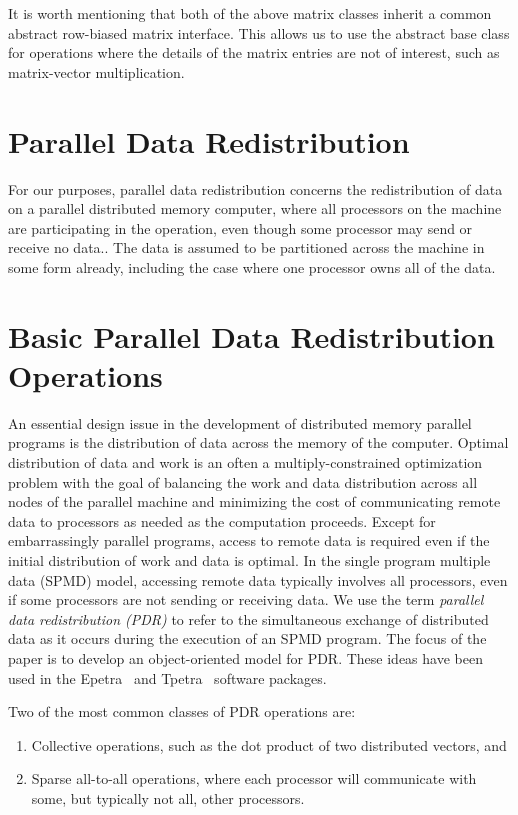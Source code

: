 \documentclass[12pt,relax]{PetraObjectModel}
\begin{document}
It is worth mentioning that both of the above matrix classes inherit 
a common abstract row-biased matrix interface.  This allows us to use the
abstract base class for operations where the details of the matrix entries
are not of interest, such as matrix-vector multiplication.



\section{Parallel Data Redistribution}
For our purposes, parallel data redistribution concerns the redistribution of 
data on a parallel distributed memory computer, where all processors on the 
machine are participating in the operation, even though some processor may send
or receive no data..  The data is assumed to be 
partitioned across the machine in some form already, including the case where one
processor owns all of the data.


\section{Basic Parallel Data Redistribution Operations}

An essential design issue in the development of distributed memory parallel programs is the
distribution of data across the memory of the computer.  Optimal distribution of data and work
is an often a multiply-constrained optimization problem with the goal of balancing the work and
data distribution across all nodes of the parallel machine and minimizing the cost of
communicating remote data to processors as needed as the computation proceeds.
Except for embarrassingly parallel programs, access to remote data is required even if
the initial distribution of work and data is optimal.  In the single program multiple data
(SPMD) model, accessing remote data typically involves all processors, even if some processors
are not sending or receiving data.  We use the term {\it parallel data
redistribution (PDR)} to refer to the simultaneous exchange of distributed data as it occurs during
the execution of an SPMD program.  The focus of the paper is to develop an object-oriented
model for PDR.  These ideas have been used in the Epetra~\cite{Epetra-Ref-Manual} and
Tpetra~\cite{Tpetra-User-Guide} software packages.

Two of the most common classes of PDR operations are:
\begin{enumerate}
\item Collective operations, such as the dot
product of two distributed vectors, and 
\item Sparse all-to-all operations, where each processor will
communicate with some, but typically not all, other processors.
\end{enumerate}
\end{document}

